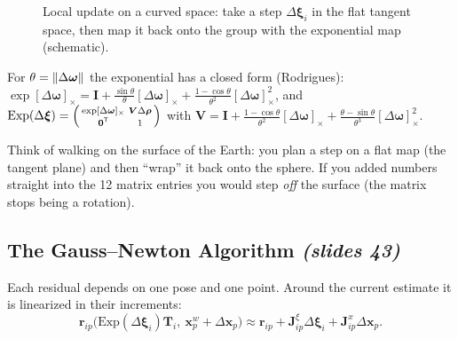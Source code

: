 \documentclass[11pt,a4paper]{article}
\newcommand{\slr}[1]{\texorpdfstring{\emph{(slides #1)}}{(slides #1)}}
\newcommand{\R}{\mathbb{R}}
\newcommand{\SE}{\mathrm{SE}(3)}
\newcommand{\se}{\mathfrak{se}(3)}
\newcommand{\sk}[1]{[#1]_{\times}}
\newcommand{\tr}{^{\mathsf T}}
\theoremstyle{definition}
\theoremstyle{plain}
\theoremstyle{remark}
\begin{document}
\begin{figure}[H]
\centering
{}
\caption{Local update on a curved space: take a step $\Delta\bm\xi_i$ in the flat tangent space, then map it back onto the group with the exponential map (schematic).}
\end{figure}

\begin{beyond}
For $\theta=\lVert \Delta\bm\omega\rVert$ the exponential has a closed form (Rodrigues): $\exp\sk{\Delta\bm\omega}=\bm I+\frac{\sin\theta}{\theta}\sk{\Delta\bm\omega}+\frac{1-\cos\theta}{\theta^2}\sk{\Delta\bm\omega}^2$, and $\mathrm{Exp}(\Delta\bm\xi)=\begin{psmallmatrix}\exp\sk{\Delta\bm\omega}&\bm V\Delta\bm\rho\\\bm0\tr&1\end{psmallmatrix}$ with $\bm V=\bm I+\frac{1-\cos\theta}{\theta^2}\sk{\Delta\bm\omega}+\frac{\theta-\sin\theta}{\theta^3}\sk{\Delta\bm\omega}^2$.
\end{beyond}

\begin{intuition}
Think of walking on the surface of the Earth: you plan a step on a flat map (the tangent plane) and then ``wrap'' it back onto the sphere. If you added numbers straight into the 12 matrix entries you would step \emph{off} the surface (the matrix stops being a rotation).
\end{intuition}

\subsection{The Gauss--Newton Algorithm \slr{43}}
Each residual depends on one pose and one point. Around the current estimate it is linearized in their increments:
\[
\bm r_{ip}\bigl(\mathrm{Exp}(\Delta\bm\xi_i)\bm T_i,\ \bm x^w_p+\Delta\bm x_p\bigr)\approx\bm r_{ip}+\bm J^{\xi}_{ip}\Delta\bm\xi_i+\bm J^x_{ip}\Delta\bm x_p .
\]
\end{document}
